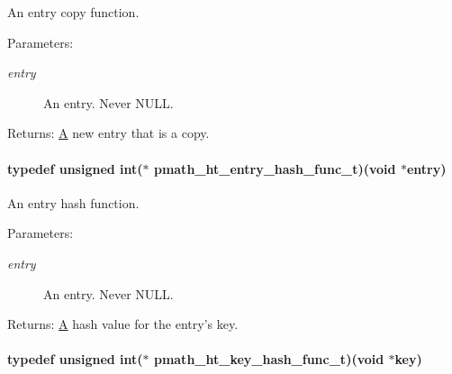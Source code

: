 An entry copy function. 

\begin{Desc}
\item[Parameters:]
\begin{description}
\item[{\em entry}]An entry. Never NULL. \end{description}
\end{Desc}
\begin{Desc}
\item[Returns:]\hyperlink{class_a}{A} new entry that is a copy. \end{Desc}
\hypertarget{group__hashtables_gb427419addea52e7f405dd9cbc6b98b5}{
\paragraph[{pmath\_\-ht\_\-entry\_\-hash\_\-func\_\-t}]{\setlength{\rightskip}{0pt plus 5cm}typedef unsigned int($\ast$ {\bf pmath\_\-ht\_\-entry\_\-hash\_\-func\_\-t})(void $\ast$entry)}\hfill}
\label{group__hashtables_gb427419addea52e7f405dd9cbc6b98b5}


An entry hash function. 

\begin{Desc}
\item[Parameters:]
\begin{description}
\item[{\em entry}]An entry. Never NULL. \end{description}
\end{Desc}
\begin{Desc}
\item[Returns:]\hyperlink{class_a}{A} hash value for the entry's key. \end{Desc}
\hypertarget{group__hashtables_g9285a6676b14812f6b4856493617b3fb}{
\paragraph[{pmath\_\-ht\_\-key\_\-hash\_\-func\_\-t}]{\setlength{\rightskip}{0pt plus 5cm}typedef unsigned int($\ast$ {\bf pmath\_\-ht\_\-key\_\-hash\_\-func\_\-t})(void $\ast$key)}\hfill}
\label{group__hashtables_g9285a6676b14812f6b4856493617b3fb}


